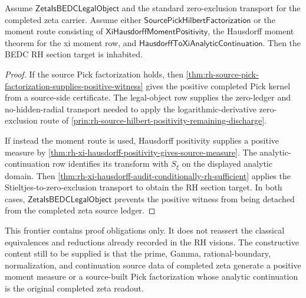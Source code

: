 \begin{theorem}
\label{thm:rh-source-positive-frontier-conditionally-sufficient}
Assume $\mathsf{ZetaIsBEDCLegalObject}$ and the standard zero-exclusion
transport for the completed zeta carrier. Assume either
$\mathsf{SourcePickHilbertFactorization}$ or the moment route consisting
of $\mathsf{XiHausdorffMomentPositivity}$, the Hausdorff moment theorem
for the xi moment row, and
$\mathsf{HausdorffToXiAnalyticContinuation}$. Then the BEDC RH section
target is inhabited.
\end{theorem}

\begin{proof}
If the source Pick factorization holds, then
\autoref{thm:rh-source-pick-factorization-supplies-positive-witness}
gives the positive completed Pick kernel from a source-side certificate.
The legal-object row supplies the zero-ledger and no-hidden-radial
transport needed to apply the logarithmic-derivative zero-exclusion
route of \autoref{prin:rh-source-hilbert-positivity-remaining-discharge}.

If instead the moment route is used, Hausdorff positivity supplies a
positive measure by
\autoref{thm:rh-xi-hausdorff-positivity-gives-source-measure}. The
analytic-continuation row identifies its transform with $S_{\xi}$ on the
displayed analytic domain. Then
\autoref{thm:rh-xi-hausdorff-audit-conditionally-rh-sufficient} applies
the Stieltjes-to-zero-exclusion transport to obtain the RH section
target. In both cases, $\mathsf{ZetaIsBEDCLegalObject}$ prevents the
positive witness from being detached from the completed zeta source
ledger.
\end{proof}

\begin{principle}
\label{prin:rh-source-positive-frontier-status}
This frontier contains proof obligations only. It does not reassert the
classical equivalences and reductions already recorded in the RH
visions. The constructive content still to be supplied is that the
prime, Gamma, rational-boundary, normalization, and continuation source
data of completed zeta generate a positive moment measure or a
source-built Pick factorization whose analytic continuation is the
original completed zeta readout.
\end{principle}

